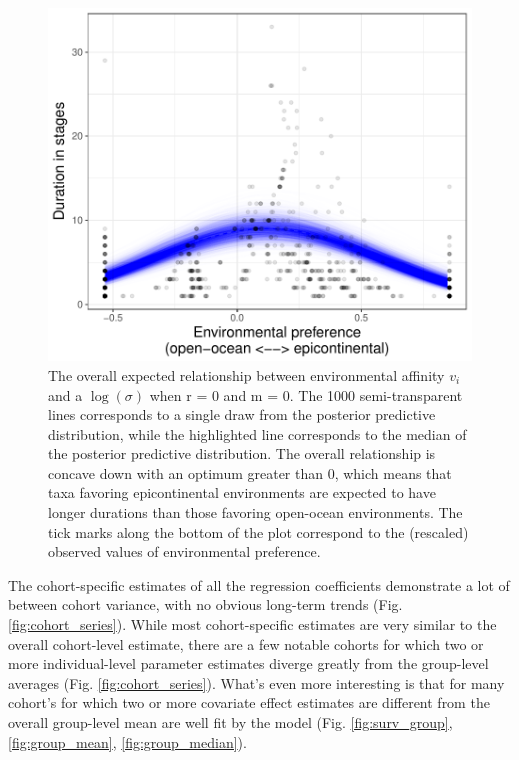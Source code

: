 \documentclass[11pt]{article}
\begin{document}
\begin{figure}[ht]
  \centering
  \includegraphics[height = 0.5\textheight,width=\textwidth,keepaspectratio=true]{figure/env_effect_med_cweib_cens}
  \caption{The overall expected relationship between environmental affinity \(v_{i}\) and a \(\log(\sigma)\) when r = 0 and m = 0. The 1000 semi-transparent lines corresponds to a single draw from the posterior predictive distribution, while the highlighted line corresponds to the median of the posterior predictive distribution. The overall relationship is concave down with an optimum greater than 0, which means that taxa favoring epicontinental environments are expected to have longer durations than those favoring open-ocean environments. The tick marks along the bottom of the plot correspond to the (rescaled) observed values of environmental preference.}
  \label{fig:env_mean}
\end{figure}


The cohort-specific estimates of all the regression coefficients demonstrate a lot of between cohort variance, with no obvious long-term trends (Fig. \ref{fig:cohort_series}). While most cohort-specific estimates are very similar to the overall cohort-level estimate, there are a few notable cohorts for which two or more individual-level parameter estimates diverge greatly from the group-level averages (Fig. \ref{fig:cohort_series}). What's even more interesting is that for many cohort's for which two or more covariate effect estimates are different from the overall group-level mean are well fit by the model (Fig. \ref{fig:surv_group}, \ref{fig:group_mean}, \ref{fig:group_median}).
\end{document}
